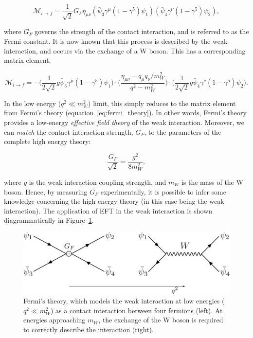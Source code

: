 \begin{equation}\label{eq:fermi_theory}
    \mathcal{M}_{i \rightarrow f} = \frac{1}{\sqrt{2}}G_F \eta_{\mu\nu} (\bar{\psi}_3 \gamma^\mu(1-\gamma^5) \psi_1)(\bar{\psi}_4 \gamma^\nu(1-\gamma^5) \psi_2),
\end{equation}

\noindent
where $G_F$ governs the strength of the contact interaction, and is referred to as the Fermi constant. It is now known that this process is described by the weak interaction, and occurs via the exchange of a W boson. This has a corresponding matrix element,

\begin{equation}
    \mathcal{M}_{i \rightarrow f} = -\Big( \frac{1}{2\sqrt{2}}g\bar{\psi}_3 \gamma^\mu(1-\gamma^5) \psi_1 \Big) \cdot \Big( \frac{\eta_{\mu\nu}-q_{\mu}q_\nu/m_W^2}{q^2-m_W^2} \Big) \cdot \Big( \frac{1}{2\sqrt{2}}g\bar{\psi}_4 \gamma^\nu(1-\gamma^5) \psi_2 \Big).
\end{equation}

\noindent
In the low energy ($q^2 \ll m_W^2$) limit, this simply reduces to the matrix element from Fermi's theory (equation~\ref{eq:fermi_theory}). In other words, Fermi's theory provides a low-energy \textit{effective field theory} of the weak interaction. Moreover, we can \textit{match} the contact interaction strength, $G_F$, to the parameters of the complete high energy theory:

\begin{equation}
    \frac{G_F}{\sqrt{2}} = \frac{g^2}{8m_W^2},
\end{equation}

\noindent
where $g$ is the weak interaction coupling strength, and $m_W$ is the mass of the W boson. Hence, by measuring $G_F$ experimentally, it is possible to infer some knowledge concerning the high energy theory (in this case being the weak interaction). The application of EFT in the weak interaction is shown diagrammatically in Figure~\ref{fig:fermi_theory}.

\begin{figure}[htb!]
  \centering
  \includegraphics[width=.8\linewidth]{Figures/theory/fermi_theory.pdf}
  \caption[Fermi's theory of the weak interaction]
  {
    Fermi's theory, which models the weak interaction at low energies ($q^2 \ll m_W^2$) as a contact interaction between four fermions (left). At energies approaching $m_W$, the exchange of the W boson is required to correctly describe the interaction (right).
  }
  \label{fig:fermi_theory}
\end{figure}

